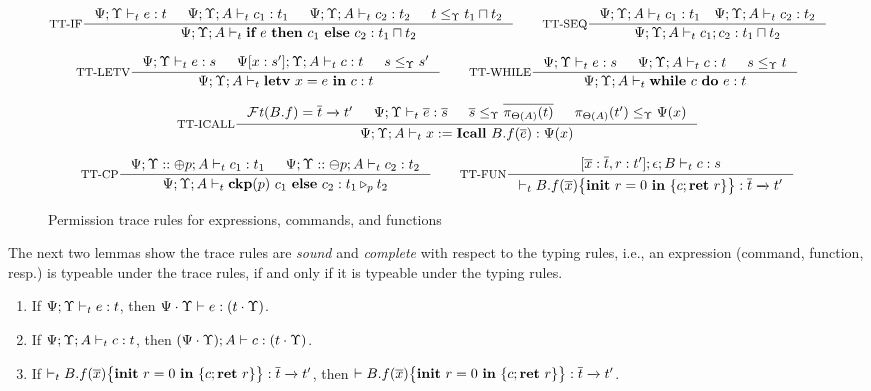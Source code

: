 {{{\begin{figure*}[ht]
\begin{tiny}
\[
\inference[TT-IF]
{
\Psi;\trace \vdash_{t} e : t &
\Psi;\trace; A \vdash_{t} c_1 : t_1 &
\Psi;\trace; A \vdash_{t} c_2 : t_2 &
t \leq_{\trace} t_1\sqcap t_2
}
{\Psi;\trace;  A \vdash_{t} \lcIF{e}{c_1}{c_2} : t_1\sqcap t_2}
\qquad
\inference[TT-SEQ]
{\Psi;\trace; A \vdash_{t} c_1 : t_1 \quad \Psi;\trace; A \vdash_{t} c_2 : t _2}
{\Psi;\trace; A \vdash_{t} \lcSEQ{c_1}{c_2} : t_1\sqcap t_2}
\]

\[
\inference[TT-LETV]
{\Psi;\trace \vdash_{t} e : s &
\Psi[x:s']; \trace; A \vdash_{t} c : t & s \leq_{\trace} s' }
{\Psi;\trace; A\vdash_{t} \lcLETV{x}{e}{c} :  t}
\qquad
\inference[TT-WHILE]
{
\Psi;\trace \vdash_{t} e : s &
\Psi;\trace; A \vdash_{t} c : t &  s\leq_{\trace} t  }
{\Psi;\trace; A \vdash_{t} \lcWHILE{c}{e} : t }
\]

\[
\inference[TT-ICALL]
{
\FT(B.f) = \overline{t} \xrightarrow{} t'  &
\Psi;\trace \vdash_{t} \overline{e} : \overline{s} &
\overline{s}\leq_{\trace} \overline{\app{t}{\Theta(A)}} &
\app{t'}{\Theta(A)}\leq_{\trace} \Psi(x)
}
{\Psi;\trace; A \vdash_{t} \lcCALL{x}{B.f}{\overline{e}} : \Psi(x)}
\]

\[
\inference[TT-CP]
{\Psi;\trace::\tplus{ p}; A \vdash_{t} c_1 : t_1 &
\Psi;\trace::\tminus{p}; A \vdash_{t} c_2 : t_2}
{\Psi;\trace; A \vdash_{t} \lcCP{p}{c_1}{c_2} : \omerge{p} {t_1}{t_2}}
\qquad
\inference[TT-FUN]
{
[\overline{ x}: \overline{t},\lpRES:t'];\epsilon; B \vdash_{t} c : s
}
{\vdash_{t} \lpPROG{B.f}{\overline{x}}{c}{\lpRES} :  \overline{t}\xrightarrow{} t'}
\]
\end{tiny}
\caption{Permission trace rules for expressions, commands, and functions} \label{fig:infer-rules}
\end{figure*}

 

The next two lemmas show the trace rules are \emph{sound} and \emph{complete} with respect to the typing rules, i.e., an expression (command, function, resp.)  is typeable under the trace rules, if and only if it is typeable under the typing rules.

\begin{lemma}\label{lem:ptrsound}
{\myeqsize
\begin{enumerate}[label=(\alph*),topsep=1pt,itemsep=-1ex,partopsep=1ex,parsep=0ex]
\item\label{lem:ptrsound-1} If $\Psi;\Upsilon\vdash_{t} e : t$, then $\Psi\cdot\Upsilon\vdash e : (t\cdot\Upsilon)$.
\item\label{lem:ptrsound-2} If $\Psi;\Upsilon; A \vdash_{t} c : t$, then $(\Psi\cdot\Upsilon); A \vdash c : (t\cdot\Upsilon)$.
\item\label{lem:ptrsound-3} If $\vdash_{t} {B.f}(\overline{x})\big\{{{\textbf{init}~ {r}=0 ~\textbf{in}~\{{c};\textbf{ret}~{r}\}}}\big\}  : \overline{t}\xrightarrow{} t'$, then $ \vdash {B.f}(\overline{x})\big\{{{\textbf{init}~ {r}=0 ~\textbf{in}~\{{c};\textbf{ret}~{r}\}}}\big\}  : \overline{t}\xrightarrow{} t'$.
\end{enumerate}}
\end{lemma}


}}}
